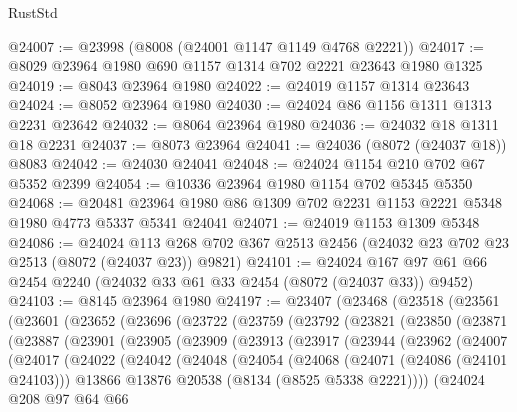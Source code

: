\begin{lexlean}{RustStd}
\begin{coremodule}
{\begin{coremodule}
{{{{{{{{{{{{{{{{{{{{{{{{{{{{{{{{{{{{{{{{{{{{{{{{{{{{{@24007 := @23998 (@8008 (@24001 @1147 @1149 @4768 @2221))
@24017 := @8029 @23964 @1980 @690 @1157 @1314 @702 @2221 @23643 @1980 @1325
@24019 := @8043 @23964 @1980
@24022 := @24019 @1157 @1314 @23643
@24024 := @8052 @23964 @1980
@24030 := @24024 @86 @1156 @1311 @1313 @2231 @23642
@24032 := @8064 @23964 @1980
@24036 := @24032 @18 @1311 @18 @2231
@24037 := @8073 @23964
@24041 := @24036 (@8072 (@24037 @18)) @8083
@24042 := @24030 @24041
@24048 := @24024 @1154 @210 @702 @67 @5352 @2399
@24054 := @10336 @23964 @1980 @1154 @702 @5345 @5350
@24068 := @20481 @23964 @1980 @86 @1309 @702 @2231 @1153 @2221 @5348 @1980 @4773 @5337 @5341 @24041
@24071 := @24019 @1153 @1309 @5348
@24086 := @24024
    @113
    @268
    @702
    @367
    @2513
    @2456
    (@24032 @23 @702 @23 @2513 (@8072 (@24037 @23)) @9821)
@24101 := @24024 @167 @97 @61 @66 @2454 @2240 (@24032 @33 @61 @33 @2454 (@8072 (@24037 @33)) @9452)
@24103 := @8145 @23964 @1980
@24197 := @23407
    (@23468
      (@23518
        (@23561
          (@23601
            (@23652
              (@23696
                (@23722
                  (@23759
                    (@23792
                      (@23821
                        (@23850
                          (@23871
                            (@23887
                              (@23901
                                (@23905
                                  (@23909
                                    (@23913
                                      (@23917
                                        (@23944
                                          (@23962
                                            (@24007
                                              (@24017
                                                (@24022
                                                  (@24042
                                                    (@24048
                                                      (@24054
                                                        (@24068
                                                          (@24071 (@24086 (@24101 @24103)))
                                                          @13866
                                                          @13876
                                                          @20538
                                                          (@8134 (@8525 @5338 @2221))))
                                                      (@24024
                                                        @208
                                                        @97
                                                        @64
                                                        @66
}}}}}}}}}}}}}}}}}}}}}}}}}}}}}}}}}}}}}}}}}}}}}}}}}}}}}
\end{coremodule}}
\end{coremodule}
\end{lexlean}

